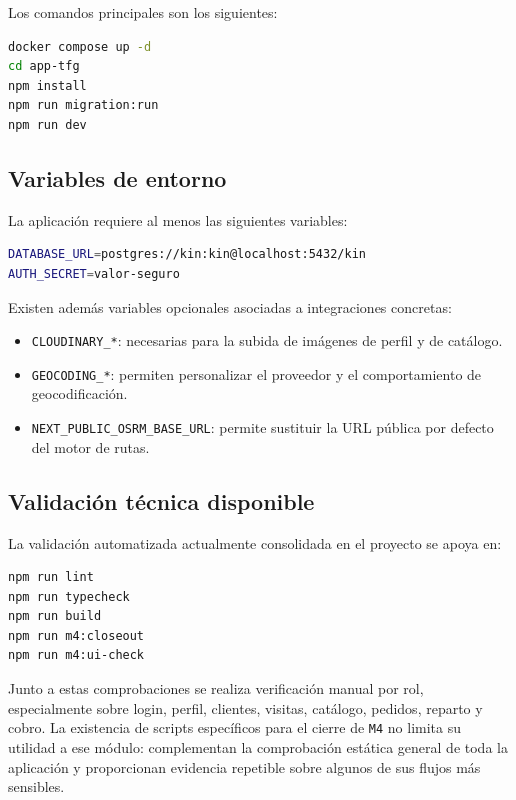 Los comandos principales son los siguientes:

\begin{lstlisting}[language=bash]
docker compose up -d
cd app-tfg
npm install
npm run migration:run
npm run dev
\end{lstlisting}

\subsection{Variables de entorno}

La aplicación requiere al menos las siguientes variables:

\begin{lstlisting}[language=bash]
DATABASE_URL=postgres://kin:kin@localhost:5432/kin
AUTH_SECRET=valor-seguro
\end{lstlisting}

Existen además variables opcionales asociadas a integraciones concretas:

\begin{itemize}
    \item \texttt{CLOUDINARY\_*}: necesarias para la subida de imágenes de perfil y de catálogo.
    \item \texttt{GEOCODING\_*}: permiten personalizar el proveedor y el comportamiento de geocodificación.
    \item \texttt{NEXT\_PUBLIC\_OSRM\_BASE\_URL}: permite sustituir la URL pública por defecto del motor de rutas.
\end{itemize}

\subsection{Validación técnica disponible}

La validación automatizada actualmente consolidada en el proyecto se apoya en:

\begin{lstlisting}[language=bash]
npm run lint
npm run typecheck
npm run build
npm run m4:closeout
npm run m4:ui-check
\end{lstlisting}

Junto a estas comprobaciones se realiza verificación manual por rol, especialmente sobre login, perfil, clientes, visitas, catálogo, pedidos, reparto y cobro. La existencia de scripts específicos para el cierre de \texttt{M4} no limita su utilidad a ese módulo: complementan la comprobación estática general de toda la aplicación y proporcionan evidencia repetible sobre algunos de sus flujos más sensibles.
